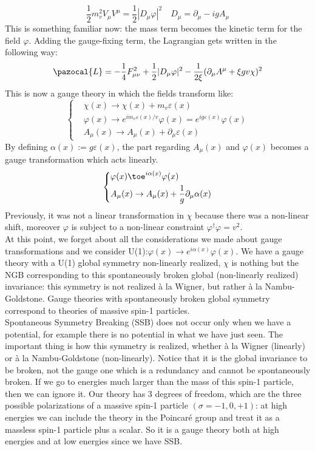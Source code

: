 \documentclass[../main.tex]{subfiles}
\begin{document}
\[
\frac{1}{2}m_v^2V_\mu V^\mu=\frac{1}{2}|D_\mu\varphi|^2 \quad D_\mu=\partial_\mu-igA_\mu
\]
This is something familiar now: the mass term becomes the kinetic term for the field $\varphi$. Adding the gauge-fixing term, the Lagrangian gets written in the following way:
\[
\pazocal{L}=-\frac{1}{4}F_{\mu\nu}^2+\frac{1}{2}|D_\mu\varphi|^2-\frac{1}{2\xi}(\partial_\mu A^\mu+\xi gv\chi)^2
\]
This is now a gauge theory in which the fields transform like:
\[
\left\{
\begin{aligned}
&\chi(x)\to\chi(x)+m_v\varepsilon(x)\\
&\varphi(x)\to e^{im_v\varepsilon(x)/v}\varphi(x)=e^{ig\varepsilon(x)}\varphi(x)\\
&A_\mu(x)\to A_\mu(x)+\partial_\mu\varepsilon(x)
\end{aligned}
\right.
\]
By defining $\alpha(x):=g\varepsilon(x)$, the part regarding $A_\mu(x)$ and $\varphi(x)$ becomes a gauge transformation which acts linearly. 
\[
\left\{
\begin{aligned}
&\varphi(x)\toe^{i\alpha(x)}\varphi(x)\\
&A_\mu(x)\to A_\mu(x)+\frac{1}{g}\partial_\mu\alpha(x)
\end{aligned}
\right.
\]
Previously, it was not a linear transformation in $\chi$ because there was a non-linear shift, moreover $\varphi$ is subject to a non-linear constraint $\varphi^\dagger\varphi=v^2$.\\
At this point, we forget about all the considerations we made about gauge transformations and we consider U(1):$\varphi(x)\to e^{i\alpha(x)}\varphi(x)$. We have a gauge theory with a U(1) global symmetry non-linearly realized, $\chi$ is nothing but the NGB corresponding to this spontaneously broken global (non-linearly realized) invariance: this symmetry is not realized à la Wigner, but rather à la Nambu-Goldstone. Gauge theories with spontaneously broken global symmetry correspond to theories of massive spin-1 particles.\\
Spontaneous Symmetry Breaking (SSB) does not occur only when we have a potential, for example there is no potential in what we have just seen. The important thing is how this symmetry is realized, whether à la Wigner (linearly) or à la Nambu-Goldstone (non-linearly). Notice that it is the global invariance to be broken, not the gauge one which is a redundancy and cannot be spontaneously broken. If we go to energies much larger than the mass of this spin-1 particle, then we can ignore it. Our theory has 3 degrees of freedom, which are the three possible polarizations of a massive spin-1 particle $(\sigma=-1,0,+1)$: at high energies we can include the theory in the Poincaré group and treat it as a massless spin-1 particle plus a scalar. So it is a gauge theory both at high energies and at low energies since we have SSB.\\
\end{document}
